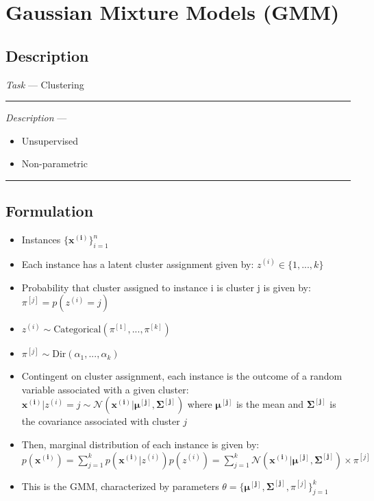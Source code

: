 \section{Gaussian Mixture Models (GMM)}
\subsection*{Description}
\emph{Task} --- Clustering

{\color{lightgray}\hrule height 0.001mm}

\emph{Description} --- 
\begin{itemize}
    \item Unsupervised
    \item Non-parametric
\end{itemize}

{\color{black}\hrule height 0.001mm}

\subsection*{Formulation}

\begin{itemize}
    \item Instances $\{\boldsymbol{x^{(i)}}\}_{i=1}^n$
    \item Each instance has a latent cluster assignment given by: $z^{(i)} \in \{1,...,k\}$
    \item Probability that cluster assigned to instance i is cluster j is given by: $\pi^{[j]} = p(z^{(i)} = j)$ 
    \item $z^{(i)} \sim \textrm{Categorical}(\pi^{[1]}, ..., \pi^{[k]})$
    \item $\pi^{[j]} \sim \textrm{Dir}(\alpha_1, ..., \alpha_k)$
    \item Contingent on cluster assignment, each instance is the outcome of a random variable associated with a given cluster: $\boldsymbol{x^{(i)}} | z^{(i)} = j \sim \mathcal{N}(\boldsymbol{x^{(i)}} | \boldsymbol{\mu^{[j]}}, \boldsymbol{\Sigma^{[j]}})$ where $\boldsymbol{\mu^{[j]}}$ is the mean and $\boldsymbol{\Sigma^{[j]}}$ is the covariance associated with cluster $j$
    \item Then, marginal distribution of each instance is given by: $p(\boldsymbol{x^{(i)}}) = \sum_{j=1}^k p(\boldsymbol{x^{(i)}} | z^{(i)}) p(z^{(i)}) = \sum_{j=1}^k \mathcal{N}(\boldsymbol{x^{(i)}} | \boldsymbol{\mu^{[j]}}, \boldsymbol{\Sigma^{[j]}}) \times \pi^{[j]}$
    \item This is the GMM, characterized by parameters $\theta = \{ \boldsymbol{\mu^{[j]}}, \boldsymbol{\Sigma^{[j]}}, \pi^{[j]} \}_{j=1}^k$
\end{itemize}


